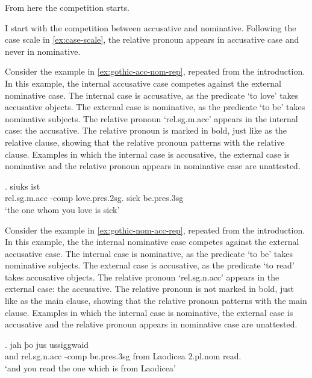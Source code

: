 From here the competition starts.

I start with the competition between accusative and nominative. Following the case scale in \ref{ex:case-scale}, the relative pronoun appears in accusative case and never in nominative.

Consider the example in \ref{ex:gothic-acc-nom-rep}, repeated from the introduction. In this example, the internal accusative case competes against the external nominative case.
The internal case is accusative, as the predicate  `to love' takes accusative objects.
The external case is nominative, as the predicate  `to be' takes nominative subjects.
The relative pronoun  `\ac{rel}.\ac{sg}.\ac{m}.\ac{acc}' appears in the internal case: the accusative. The relative pronoun is marked in bold, just like as the relative clause, showing that the relative pronoun patterns with the relative clause.
Examples in which the internal case is accusative, the external case is nominative and the relative pronoun appears in nominative case are unattested.

\exg.    siuks ist\\
 \ac{rel}.\ac{sg}.\ac{m}.\ac{acc} -\ac{comp} love.\ac{pres}.2\ac{sg}.\scsub{[acc]} sick be.\ac{pres}.3\ac{sg}\scsub{[nom]}\\
 `the one whom you love is sick' \label{ex:gothic-acc-nom-rep}

Consider the example in \ref{ex:gothic-nom-acc-rep}, repeated from the introduction. In this example, the the internal nominative case competes against the external accusative case.
The internal case is nominative, as the predicate  `to be' takes nominative subjects.
The external case is accusative, as the predicate  `to read' takes accusative objects.
The relative pronoun  `\ac{rel}.\ac{sg}.\ac{n}.\ac{acc}' appears in the external case: the accusative. The relative pronoun is not marked in bold, just like as the main clause, showing that the relative pronoun patterns with the main clause.
Examples in which the internal case is nominative, the external case is accusative and the relative pronoun appears in nominative case are unattested.

\exg. jah þo     jus ussiggwaid\\
 and \ac{rel}.\ac{sg}.\ac{n}.\ac{acc} -\ac{comp} be.\ac{pres}.3\ac{sg}\scsub{[nom]} from Laodicea 2.\ac{pl}.\ac{nom} read.\scsub{[acc]}\\
 `and you read the one which is from Laodicea' \label{ex:gothic-nom-acc-rep}

